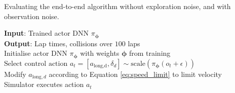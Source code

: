 \begin{algorithm}[b]
\caption{Evaluating the end-to-end algorithm without exploration noise, and with observation noise.}
\label{alg:end_to_end_deploy}
\nonl\textbf{Input}: Trained actor DNN $\pi_{\bm{\phi}}$ \\
\nonl\textbf{Output}: Lap times, collisions over $100$ laps \vspace{0.2cm}\\
Initialise actor DNN $\pi_{\bm{\phi}}$ with weights $\bm{\phi}$ from training \\
{
    {
        $\text{Select control action } a_t = [a_{\text{long,d}}, \delta_{d}] \sim \text{scale}(\pi_{\bm{\phi}}(o_t+\epsilon))$ \\
        {   
            Modify $a_{\text{long},d}$ according to Equation \ref{eq:speed_limit} to limit velocity \\
            Simulator executes action $a_t$ \\
        }
    }
}
\end{algorithm}